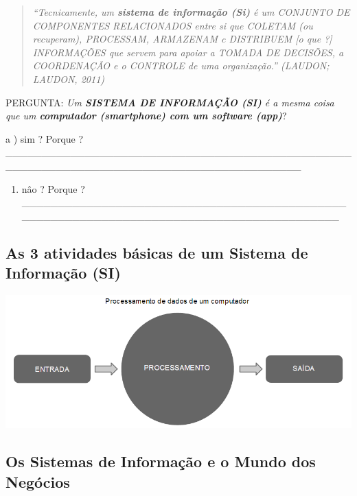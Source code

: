 \documentclass[
]{book}
\providecommand{\tightlist}{%
  \setlength{\itemsep}{0pt}\setlength{\parskip}{0pt}}
\begin{document}
\begin{quote}
\emph{``Tecnicamente, um \textbf{sistema de informação (Si)} é um CONJUNTO DE COMPONENTES RELACIONADOS entre si que COLETAM (ou recuperam), PROCESSAM, ARMAZENAM c DISTRIBUEM {[}o que ?{]} INFORMAÇÕES que servem para apoiar a TOMADA DE DECISÕES, a COORDENAÇÃO e o CONTROLE de uma organização.'' (LAUDON; LAUDON, 2011)}
\end{quote}

PERGUNTA: \emph{Um \textbf{SISTEMA DE INFORMAÇÃO (SI)} é a mesma coisa que um \textbf{computador (smartphone) com um software (app)}}?

a ) sim ? Porque ?\_\_\_\_\_\_\_\_\_\_\_\_\_\_\_\_\_\_\_\_\_\_\_\_\_\_\_\_\_\_\_\_\_\_\_\_\_\_\_\_\_\_\_\_\_\_\_\_\_\_\_\_\_\_\_\_\_\_\_\_\_\_\_\_\_\_\_\_\_\_\_\_\_\_\_\_\_\_\_\_\_\_\_\_\_\_\_\_\_

\begin{enumerate}
\def\labelenumi{\alph{enumi})}
\setcounter{enumi}{1}
\tightlist
\item
  nâo ? Porque ?\_\_\_\_\_\_\_\_\_\_\_\_\_\_\_\_\_\_\_\_\_\_\_\_\_\_\_\_\_\_\_\_\_\_\_\_\_\_\_\_\_\_\_\_\_\_\_\_\_\_\_\_\_\_\_\_\_\_\_\_\_\_\_\_\_\_\_\_\_\_\_\_\_\_\_\_\_\_\_\_\_\_\_\_\_\_\_\_\_
\end{enumerate}

\subsection{As 3 atividades básicas de um Sistema de Informação (SI)}\label{as-3-atividades-buxe1sicas-de-um-sistema-de-informauxe7uxe3o-si}

\includegraphics{images/processamento-dados-computador.png}

\subsection{Os Sistemas de Informação e o Mundo dos Negócios}\label{os-sistemas-de-informauxe7uxe3o-e-o-mundo-dos-neguxf3cios}
\end{document}
